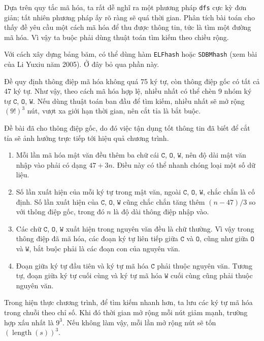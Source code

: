 \documentclass[11pt]{article}
\begin{document}
Dựa trên quy tắc mã hóa, ta rất dễ nghĩ ra một phương pháp \texttt{dfs} cực
kỳ đơn giản; tất nhiên phương pháp ấy rõ ràng sẽ quá thời gian. Phân tích bài
toán cho thấy đề yêu cầu một cách mã hóa để thu được thông tin, tức là tìm một
đường mã hóa. Vì vậy ta buộc phải dùng thuật toán tìm kiếm theo chiều rộng.

Với cách xây dựng bảng băm, có thể dùng hàm \texttt{ELFhash} hoặc
\texttt{SDBMhash} (xem bài của Li Yuxiu năm 2005). Ở đây bỏ qua phần này.

Đề quy định thông điệp mã hóa không quá 75 ký tự, còn thông điệp gốc có tất
cả 47 ký tự. Như vậy, theo cách mã hóa hợp lệ, nhiều nhất có thể chèn 9 nhóm
ký tự \(\texttt{C}\), \(\texttt{O}\), \(\texttt{W}\). Nếu dùng thuật toán ban
đầu để tìm kiếm, nhiều nhất sẽ mở rộng \((9!)^3\) nút, vượt xa giới hạn thời
gian, nên cắt tỉa là bắt buộc.

Đề bài đã cho thông điệp gốc, do đó việc tận dụng tốt thông tin đã biết để cắt
tỉa sẽ ảnh hưởng trực tiếp tới hiệu quả chương trình.

\begin{enumerate}
  \item Mỗi lần mã hóa mật văn đều thêm ba chữ cái \(\texttt{C}\),
  \(\texttt{O}\), \(\texttt{W}\), nên độ dài mật văn nhập vào phải có dạng
  \(47+3n\). Điều này có thể nhanh chóng loại một số dữ liệu.
  \item Số lần xuất hiện của mỗi ký tự trong mật văn, ngoài
  \(\texttt{C}\), \(\texttt{O}\), \(\texttt{W}\), chắc chắn là cố định. Số
  lần xuất hiện của \(\texttt{C}\), \(\texttt{O}\), \(\texttt{W}\) cũng chắc
  chắn tăng thêm \((n-47)/3\) so với thông điệp gốc, trong đó \(n\) là độ dài
  thông điệp nhập vào.
  \item Các chữ \(\texttt{C}\), \(\texttt{O}\), \(\texttt{W}\) xuất hiện trong
  nguyên văn đều là chữ thường. Vì vậy trong thông điệp đã mã hóa, các đoạn
  ký tự liên tiếp giữa \(\texttt{C}\) và \(\texttt{O}\), cũng như giữa
  \(\texttt{O}\) và \(\texttt{W}\), bắt buộc phải là các đoạn con của nguyên
  văn.
  \item Đoạn giữa ký tự đầu tiên và ký tự mã hóa \(\texttt{C}\) phải thuộc
  nguyên văn. Tương tự, đoạn giữa ký tự cuối cùng và ký tự mã hóa
  \(\texttt{W}\) cuối cùng cũng phải thuộc nguyên văn.
\end{enumerate}

Trong hiện thực chương trình, để tìm kiếm nhanh hơn, ta lưu các ký tự mã hóa
trong chuỗi theo chỉ số. Khi đó thời gian mở rộng mỗi nút giảm mạnh, trường
hợp xấu nhất là \(9^3\). Nếu không làm vậy, mỗi lần mở rộng nút sẽ tốn
\((\operatorname{length}(s))^3\).
\end{document}
